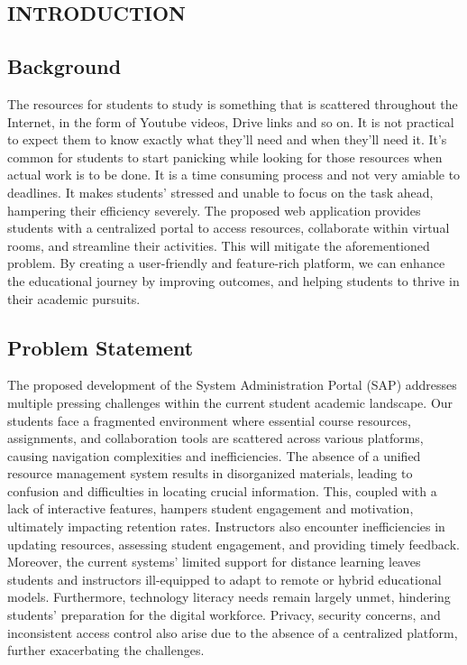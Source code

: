 \begin{center}
\section{INTRODUCTION}
\end{center}
\subsection{Background}
The resources for students to study is something that is scattered throughout the Internet, in the form of Youtube videos, Drive links and so on. It is not practical to expect them to know exactly what they'll need and when they'll need it. It's common for students to start panicking while looking for those resources when actual work is to be done. It is a time consuming process and not very amiable to deadlines. It makes students' stressed and unable to focus on the task ahead, hampering their efficiency severely.
The proposed web application provides students with a centralized portal to access resources, collaborate within virtual rooms, and streamline their activities. This will mitigate the aforementioned problem. By creating a user-friendly and feature-rich platform, we can enhance the educational journey by improving outcomes, and helping students to thrive in their academic pursuits.
\newpage

\subsection{Problem Statement}
The proposed development of the System Administration Portal (SAP) addresses multiple pressing challenges within the current student academic landscape. Our students face a fragmented environment where essential course resources, assignments, and collaboration tools are scattered across various platforms, causing navigation complexities and inefficiencies. The absence of a unified resource management system results in disorganized materials, leading to confusion and difficulties in locating crucial information. This, coupled with a lack of interactive features, hampers student engagement and motivation, ultimately impacting retention rates. Instructors also encounter inefficiencies in updating resources, assessing student engagement, and providing timely feedback. Moreover, the current systems' limited support for distance learning leaves students and instructors ill-equipped to adapt to remote or hybrid educational models. Furthermore, technology literacy needs remain largely unmet, hindering students' preparation for the digital workforce. Privacy, security concerns, and inconsistent access control also arise due to the absence of a centralized platform, further exacerbating the challenges.
\newpage

